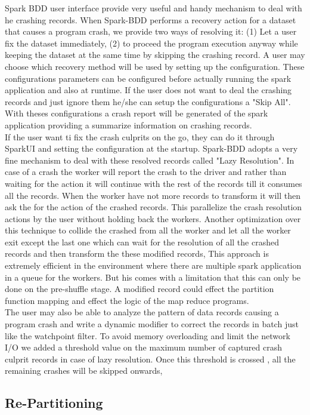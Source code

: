 \documentclass{acm_proc_article-sp}
\begin{document}
Spark BDD user interface provide very useful and handy mechanism to deal with he crashing records. When Spark-BDD performs a recovery action for a dataset that causes a program crash, we provide two ways of resolving it: (1) Let a user fix the dataset immediately, (2) to proceed the program execution anyway while keeping the dataset at the same time by skipping the crashing record. A user may choose which recovery method will be used by setting up the configuration. These configurations parameters can be configured before actually running the spark application and also at runtime. If the user does not want to deal the crashing records and just ignore them he/she can setup the configurations a "Skip All". With theses configurations a crash report will be generated of the spark application providing a summarize information on crashing records.\\
If the user want ti fix the crash culprits on the go, they can do it through SparkUI and setting the configuration at the startup. Spark-BDD adopts a very fine mechanism to deal with these resolved records called "Lazy Resolution". In case of a crash the worker will report the crash to the driver and rather than waiting for the action it will continue with the rest of the records till it consumes all the records. When the worker have not more records to transform it will then ask the for the action of the crashed records. This parallelize the crash resolution actions by the user without holding back the workers. Another optimization over this technique to collide the crashed from all the worker and let all the worker exit except the last one which can wait for the resolution of all the crashed records and then transform the these modified records,  This approach is extremely efficient in the environment where there are multiple spark application in a queue for the workers. But his comes with a limitation that this can only be done on the pre-shuffle stage. A modified record could effect the partition function mapping and effect the logic of the map reduce programs.\\
The user may also be able to analyze the pattern of data records causing a program crash and write a dynamic modifier to correct the records in batch just like the watchpoint filter. To avoid memory overloading and limit the network I/O we added a threshold value on the maximum number of captured crash culprit records in case of lazy resolution. Once this threshold is crossed , all the remaining crashes will be skipped onwards, 
\subsection{Re-Partitioning}
\end{document}
